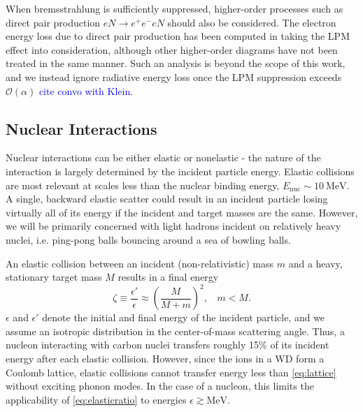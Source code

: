\documentclass[twocolumn,showpacs,preprintnumbers,amsmath,amssymb,prd]{revtex4}
\newcommand{\OO}{\mathcal{O}}
\def\r{\right)}
\def\l{\left(}
\begin{document}
\begin{appendices}
When bremsstrahlung is sufficiently suppressed, higher-order processes such as direct pair production $e N \rightarrow e^+ e^- e N$ should also be considered. The electron energy loss due to direct pair production has been computed in \cite{Gerhardt:2010bj} taking the LPM effect into consideration, although other higher-order diagrams have not been treated in the same manner. Such an analysis is beyond the scope of this work, and we instead ignore radiative energy loss once the LPM suppression exceeds $\OO(\alpha)$ \textcolor{blue}{cite convo with Klein.}

\subsection*{Nuclear Interactions}
Nuclear interactions can be either elastic or nonelastic - the nature of the interaction is largely determined by the incident particle energy. Elastic collisions are most relevant at scales less than the nuclear binding energy, $E_\text{nuc} \sim 10 ~\text{MeV}$. A single, backward elastic scatter could result in an incident particle losing virtually all of its energy if the incident and target masses are the same. However, we will be primarily concerned with light hadrons incident on relatively heavy nuclei, i.e. ping-pong balls bouncing around a sea of bowling balls.

An elastic collision between an incident (non-relativistic) mass $m$ and a heavy, stationary target mass $M$ results in a final energy
\begin{equation}
\label{eq:elasticratio}
\zeta \equiv \frac{\epsilon'}{\epsilon} \approx \l \frac{M}{M+m} \r^2, ~~~~ m < M.
\end{equation}
$\epsilon$ and $\epsilon'$ denote the initial and final energy of the incident particle, and we assume an isotropic distribution in the center-of-mass scattering angle. Thus, a nucleon interacting with carbon nuclei transfers roughly 15\% of its incident energy after each elastic collision. However, since the ions in a WD form a Coulomb lattice, elastic collisions cannot transfer energy less than \eqref{eq:lattice} without exciting phonon modes. In the case of a nucleon, this limits the applicability of \eqref{eq:elasticratio} to energies $\epsilon \gtrsim \text{MeV}$.



\end{appendices}
\end{document}
